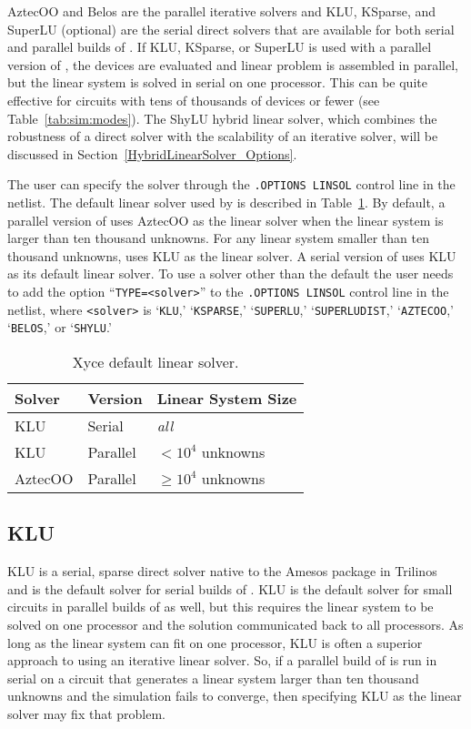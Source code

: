 AztecOO and Belos are the parallel iterative solvers and KLU, KSparse, and SuperLU (optional)
are the serial direct solvers that are available for both serial and parallel builds of \Xyce{}.  
If KLU, KSparse, or SuperLU is used with a parallel version of \Xyce{}, the devices are evaluated and
linear problem is assembled in parallel, but the linear system is solved in serial
on one processor.  This can be quite effective for circuits with tens of thousands of devices
or fewer (see Table~\ref{tab:sim:modes}). The ShyLU hybrid linear solver, which combines the robustness
of a direct solver with the scalability of an iterative solver, will be discussed in 
Section~\ref{HybridLinearSolver_Options}.  

The user can specify the solver through the \texttt{.OPTIONS LINSOL} control line 
in the netlist.  The default linear solver used by \Xyce{} is described in Table~\ref{tab:default:solver}.
By default, a parallel version of \Xyce{} uses AztecOO as the linear solver when the linear
system is larger than ten thousand unknowns.  For any linear system smaller than ten thousand unknowns,
\Xyce{} uses KLU as the linear solver.  A serial version of \Xyce{} uses KLU as its default linear 
solver.  To use a solver other than the default the user needs to add the option 
``\texttt{TYPE=<solver>}'' to the \texttt{.OPTIONS LINSOL}
control line in the netlist, where \texttt{<solver>}
is `\texttt{KLU},' `\texttt{KSPARSE},' `\texttt{SUPERLU},' `\texttt{SUPERLUDIST},' `\texttt{AZTECOO},' `\texttt{BELOS},' or `\texttt{SHYLU}.'

\begin{table}[htp]
\caption[\Xyce{} Default Linear Solver]{Xyce default linear solver.}
\label{tab:default:solver}
\begin{center}
\begin{tabular}{| p{3cm} | p{3cm} | p{4cm} |}
\hline
Solver & Version & Linear System Size\\
\hline
KLU & Serial & {\it all} \\
KLU & Parallel & $< 10^4$ unknowns \\
AztecOO & Parallel & $\geq 10^4$ unknowns \\
\hline
\end{tabular}
\end{center}
\end{table}

\subsection{KLU}
KLU is a serial, sparse direct solver native to the Amesos package in Trilinos~\cite{trilinos:toms} and is the default solver for serial builds of \Xyce{}. 
KLU is the default solver for small circuits in parallel builds of \Xyce{} as well, but this requires the linear system to be solved 
on one processor and the solution communicated back to all processors. As long as the linear system can fit on one processor, KLU is 
often a superior approach to using an iterative linear solver.  So, if a parallel build of \Xyce{} is run in serial on a circuit that generates a linear system
larger than ten thousand unknowns and the simulation fails to converge, then specifying KLU as the linear solver may fix that problem.  

